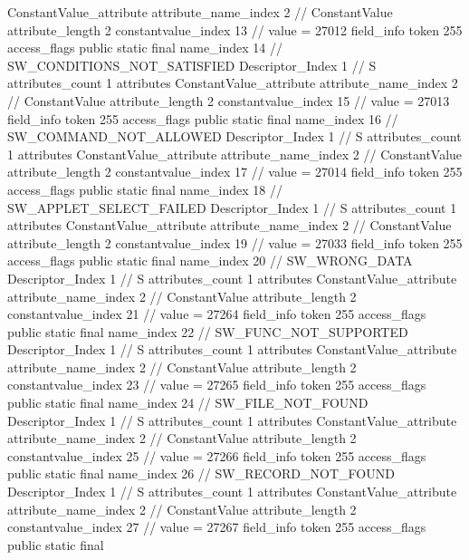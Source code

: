 {{{{{{				ConstantValue_attribute {
					attribute_name_index	2		// ConstantValue
					attribute_length	2
					constantvalue_index	13		// value = 27012
				}
				}
			}
			field_info {
				token	255
				access_flags	public static final
				name_index	14		// SW_CONDITIONS_NOT_SATISFIED
				Descriptor_Index	1		// S
				attributes_count	1
				attributes {
				ConstantValue_attribute {
					attribute_name_index	2		// ConstantValue
					attribute_length	2
					constantvalue_index	15		// value = 27013
				}
				}
			}
			field_info {
				token	255
				access_flags	public static final
				name_index	16		// SW_COMMAND_NOT_ALLOWED
				Descriptor_Index	1		// S
				attributes_count	1
				attributes {
				ConstantValue_attribute {
					attribute_name_index	2		// ConstantValue
					attribute_length	2
					constantvalue_index	17		// value = 27014
				}
				}
			}
			field_info {
				token	255
				access_flags	public static final
				name_index	18		// SW_APPLET_SELECT_FAILED
				Descriptor_Index	1		// S
				attributes_count	1
				attributes {
				ConstantValue_attribute {
					attribute_name_index	2		// ConstantValue
					attribute_length	2
					constantvalue_index	19		// value = 27033
				}
				}
			}
			field_info {
				token	255
				access_flags	public static final
				name_index	20		// SW_WRONG_DATA
				Descriptor_Index	1		// S
				attributes_count	1
				attributes {
				ConstantValue_attribute {
					attribute_name_index	2		// ConstantValue
					attribute_length	2
					constantvalue_index	21		// value = 27264
				}
				}
			}
			field_info {
				token	255
				access_flags	public static final
				name_index	22		// SW_FUNC_NOT_SUPPORTED
				Descriptor_Index	1		// S
				attributes_count	1
				attributes {
				ConstantValue_attribute {
					attribute_name_index	2		// ConstantValue
					attribute_length	2
					constantvalue_index	23		// value = 27265
				}
				}
			}
			field_info {
				token	255
				access_flags	public static final
				name_index	24		// SW_FILE_NOT_FOUND
				Descriptor_Index	1		// S
				attributes_count	1
				attributes {
				ConstantValue_attribute {
					attribute_name_index	2		// ConstantValue
					attribute_length	2
					constantvalue_index	25		// value = 27266
				}
				}
			}
			field_info {
				token	255
				access_flags	public static final
				name_index	26		// SW_RECORD_NOT_FOUND
				Descriptor_Index	1		// S
				attributes_count	1
				attributes {
				ConstantValue_attribute {
					attribute_name_index	2		// ConstantValue
					attribute_length	2
					constantvalue_index	27		// value = 27267
				}
				}
			}
			field_info {
				token	255
				access_flags	public static final
}}}}}
